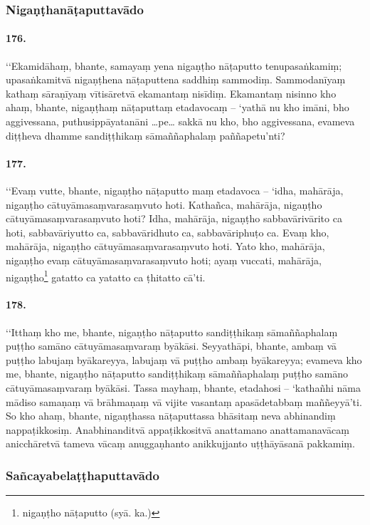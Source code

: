 \subsubsection{Nigaṇṭhanāṭaputtavādo}

\paragraph{176.} ‘‘Ekamidāhaṃ, bhante, samayaṃ yena nigaṇṭho nāṭaputto tenupasaṅkamiṃ; upasaṅkamitvā nigaṇṭhena nāṭaputtena saddhiṃ sammodiṃ. Sammodanīyaṃ kathaṃ sāraṇīyaṃ vītisāretvā ekamantaṃ nisīdiṃ. Ekamantaṃ nisinno kho ahaṃ, bhante, nigaṇṭhaṃ nāṭaputtaṃ etadavocaṃ – ‘yathā nu kho imāni, bho aggivessana, puthusippāyatanāni …pe… sakkā nu kho, bho aggivessana, evameva diṭṭheva dhamme sandiṭṭhikaṃ sāmaññaphalaṃ paññapetu’nti?

\paragraph{177.} ‘‘Evaṃ vutte, bhante, nigaṇṭho nāṭaputto maṃ etadavoca – ‘idha, mahārāja, nigaṇṭho cātuyāmasaṃvarasaṃvuto hoti. Kathañca, mahārāja, nigaṇṭho cātuyāmasaṃvarasaṃvuto hoti? Idha, mahārāja, nigaṇṭho sabbavārivārito ca hoti, sabbavāriyutto ca, sabbavāridhuto ca, sabbavāriphuṭo ca. Evaṃ kho, mahārāja, nigaṇṭho cātuyāmasaṃvarasaṃvuto hoti. Yato kho, mahārāja, nigaṇṭho evaṃ cātuyāmasaṃvarasaṃvuto hoti; ayaṃ vuccati, mahārāja, nigaṇṭho\footnote{nigaṇṭho nāṭaputto (syā. ka.)} gatatto ca yatatto ca ṭhitatto cā’ti.

\paragraph{178.} ‘‘Itthaṃ kho me, bhante, nigaṇṭho nāṭaputto sandiṭṭhikaṃ sāmaññaphalaṃ puṭṭho samāno cātuyāmasaṃvaraṃ byākāsi. Seyyathāpi, bhante, ambaṃ vā puṭṭho labujaṃ byākareyya, labujaṃ vā puṭṭho ambaṃ byākareyya; evameva kho me, bhante, nigaṇṭho nāṭaputto sandiṭṭhikaṃ sāmaññaphalaṃ puṭṭho samāno cātuyāmasaṃvaraṃ byākāsi. Tassa mayhaṃ, bhante, etadahosi – ‘kathañhi nāma mādiso samaṇaṃ vā brāhmaṇaṃ vā vijite vasantaṃ apasādetabbaṃ maññeyyā’ti. So kho ahaṃ, bhante, nigaṇṭhassa nāṭaputtassa bhāsitaṃ neva abhinandiṃ nappaṭikkosiṃ. Anabhinanditvā appaṭikkositvā anattamano anattamanavācaṃ anicchāretvā tameva vācaṃ anuggaṇhanto anikkujjanto uṭṭhāyāsanā pakkamiṃ.

\subsubsection{Sañcayabelaṭṭhaputtavādo}

